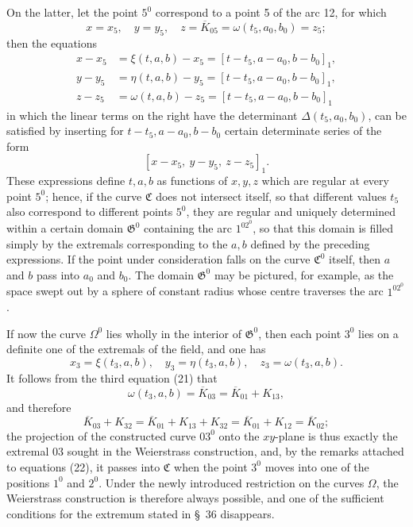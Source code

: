 \documentclass[11pt,a4paper,leqno]{article}
\begin{document}
On the latter, let the point $5^0$ correspond to a point 5 of the arc 12, for which
\[
x=x_5,\quad y=y_5,\quad z=\overline{K}_{05}=\omega(t_5,a_0,b_0)=z_5;
\]
then the equations
\begin{equation}\tag{22}
\begin{aligned}
x-x_5&=\xi(t,a,b)-x_5=[t-t_5,a-a_0,b-b_0]_1,\\
y-y_5&=\eta(t,a,b)-y_5=[t-t_5,a-a_0,b-b_0]_1,\\
z-z_5&=\omega(t,a,b)-z_5=[t-t_5,a-a_0,b-b_0]_1
\end{aligned}
\end{equation}
in which the linear terms on the right have the determinant $\Delta(t_5,a_0,b_0)$, can be satisfied by inserting for $t-t_5,a-a_0,b-b_0$ certain determinate series of the form
\[
[x-x_5,\ y-y_5,\ z-z_5]_1.
\]
These expressions define $t,a,b$ as functions of $x,y,z$ which are regular at every point $5^0$; hence, if the curve $\mathfrak{C}$ does not intersect itself, so that different values $t_5$ also correspond to different points $5^0$, they are regular and uniquely determined within a certain domain $\mathfrak{G}^0$ containing the arc $1^02^0$, so that this domain is filled simply by the extremals corresponding to the $a,b$ defined by the preceding expressions. If the point under consideration falls on the curve $\mathfrak{C}^0$ itself, then $a$ and $b$ pass into $a_0$ and $b_0$. The domain $\mathfrak{G}^0$ may be pictured, for example, as the space swept out by a sphere of constant radius whose centre traverses the arc $1^02^0$.

If now the curve $\Omega^0$ lies wholly in the interior of $\mathfrak{G}^0$, then each point $3^0$ lies on a definite one of the extremals of the field, and one has
\[
x_3=\xi(t_3,a,b),\quad y_3=\eta(t_3,a,b),\quad z_3=\omega(t_3,a,b).
\]
It follows from the third equation (21) that
\[
\omega(t_3,a,b)=\overline{K}_{03}=\overline{K}_{01}+K_{13},
\]
and therefore
\[
\overline{K}_{03}+K_{32}=\overline{K}_{01}+K_{13}+K_{32}=\overline{K}_{01}+K_{12}=\overline{K}_{02};
\]
the projection of the constructed curve $03^0$ onto the $xy$-plane is thus exactly the extremal 03 sought in the Weierstrass construction, and, by the remarks attached to equations (22), it passes into $\mathfrak{C}$ when the point $3^0$ moves into one of the positions $1^0$ and $2^0$. Under the newly introduced restriction on the curves $\Omega$, the Weierstrass construction is therefore always possible, and one of the sufficient conditions for the extremum stated in \S~36 disappears.
\end{document}
